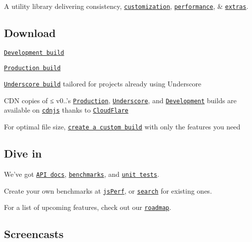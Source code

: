 A utility library delivering consistency, \href{http://lodash.com/custom-builds}{\tt customization}, \href{http://lodash.com/benchmarks}{\tt performance}, \& \href{http://lodash.com/#features}{\tt extras}.

\subsection*{Download}


\begin{DoxyItemize}
\item \href{https://raw.github.com/lodash/lodash/0.9.2/lodash.js}{\tt Development build}
\item \href{https://raw.github.com/lodash/lodash/0.9.2/lodash.min.js}{\tt Production build}
\item \href{https://raw.github.com/lodash/lodash/0.9.2/lodash.underscore.min.js}{\tt Underscore build} tailored for projects already using Underscore
\item C\+DN copies of ≤ v0..’s \href{http://cdnjs.cloudflare.com/ajax/libs/lodash.js/0.9.2/lodash.min.js}{\tt Production}, \href{http://cdnjs.cloudflare.com/ajax/libs/lodash.js/0.9.2/lodash.underscore.min.js}{\tt Underscore}, and \href{http://cdnjs.cloudflare.com/ajax/libs/lodash.js/0.9.2/lodash.js}{\tt Development} builds are available on \href{http://cdnjs.com/}{\tt cdnjs} thanks to \href{http://www.cloudflare.com/}{\tt Cloud\+Flare}
\item For optimal file size, \href{http://lodash.com/custom-builds}{\tt create a custom build} with only the features you need
\end{DoxyItemize}

\subsection*{Dive in}

We’ve got \href{http://lodash.com/docs}{\tt A\+PI docs}, \href{http://lodash.com/benchmarks}{\tt benchmarks}, and \href{http://lodash.com/tests}{\tt unit tests}.

Create your own benchmarks at \href{http://jsperf.com}{\tt js\+Perf}, or \href{http://jsperf.com/search?q=lodash}{\tt search} for existing ones.

For a list of upcoming features, check out our \href{https://github.com/lodash/lodash/wiki/Roadmap}{\tt roadmap}.

\subsection*{Screencasts}

